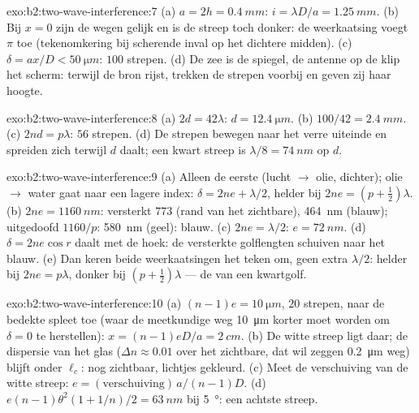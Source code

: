 \begin{solution}{exo:b2:two-wave-interference:7}
(a) $a = 2h = \qty{0.4}{mm}$: $i = \lambda D/a = \qty{1.25}{mm}$. (b) Bij
$x = 0$ zijn de wegen
gelijk en is de streep toch donker: de weerkaatsing voegt $\pi$ toe (tekenomkering
bij scherende inval op het dichtere midden). (c)
$\delta = ax/D <
\qty{50}{\micro m}$: $100$ strepen. (d) De zee is de
spiegel, de antenne op de
klip het scherm: terwijl de bron rijst, trekken de strepen voorbij en
geven zij haar hoogte.
\end{solution}

\begin{solution}{exo:b2:two-wave-interference:8}
(a) $2d = 42\lambda$: $d = \qty{12.4}{\micro m}$. (b)
$100/42 = \qty{2.4}{mm}$. (c) $2nd = p\lambda$:
$56$ strepen. (d) De strepen bewegen naar het verre uiteinde en spreiden
zich terwijl $d$
daalt; een kwart streep is $\lambda/8 = \qty{74}{nm}$ op $d$.
\end{solution}

\begin{solution}{exo:b2:two-wave-interference:9}
(a) Alleen de eerste (lucht $\to$ olie, dichter); olie $\to$ water gaat naar
een lagere
index: $\delta = 2ne + \lambda/2$, helder bij $2ne = (p + \tfrac12)\lambda$.
(b) $2ne =
\qty{1160}{nm}$: versterkt $773$ (rand van het zichtbare),
\qty{464}{nm} (blauw);
uitgedoofd $1160/p$: \qty{580}{nm} (geel): blauw. (c) $2ne = \lambda/2$:
$e = \qty{72}{nm}$.
(d) $\delta = 2ne\cos r$ daalt met de hoek: de versterkte golflengten
schuiven naar het blauw. (e) Dan keren beide weerkaatsingen het teken om, geen
extra $\lambda/2$: helder bij $2ne = p\lambda$, donker bij
$(p + \tfrac12)\lambda$ --- de
 van een kwartgolf.
\end{solution}

\begin{solution}{exo:b2:two-wave-interference:10}
(a) $(n - 1)e = \qty{10}{\micro m}$, $20$ strepen, naar de bedekte spleet toe (waar
de meetkundige weg \qty{10}{\micro m} korter moet worden om $\delta = 0$ te
herstellen):
$x = (n - 1)eD/a = \qty{2}{cm}$. (b) De witte streep ligt daar; de dispersie
van het glas
($\Delta n \approx 0.01$ over het zichtbare, dat wil zeggen \qty{0.2}{\micro m} weg)
blijft onder $\ell_c$: nog zichtbaar, lichtjes gekleurd. (c) Meet de
verschuiving van de witte streep: $e = (\text{verschuiving})\,a/(n - 1)D$.
(d) $e(n - 1)\theta^2
(1 + 1/n)/2 = \qty{63}{nm}$ bij \qty{5}{\degree}: een
achtste streep.
\end{solution}

